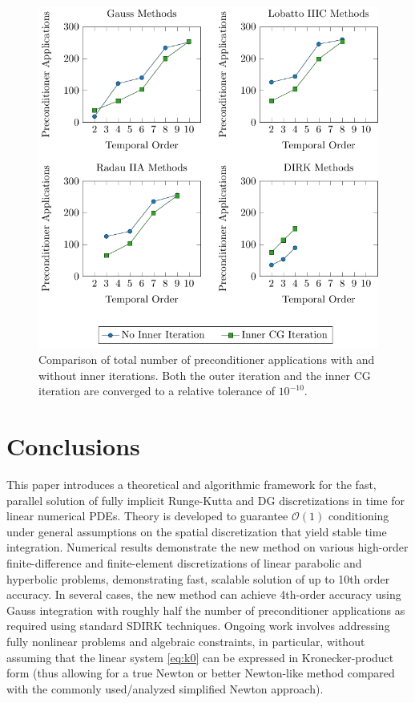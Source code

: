 \documentclass[review]{siamart}
\begin{document}
\begin{figure}[!ht]
	\centering
	\includegraphics{figures/high_order_diff_iters/high_order_diff_iters}
	\caption{
		Comparison of total number of preconditioner applications with and without
		inner iterations.
		Both the outer iteration and the inner CG iteration are converged to a
		relative tolerance of $10^{-10}$.
	}
	\label{fig:high-order-diff-iters}
\end{figure}

\section{Conclusions}\label{sec:conc}

This paper introduces a theoretical and algorithmic framework for the fast, parallel
solution of fully implicit Runge-Kutta and DG discretizations in time for linear
numerical PDEs. Theory is developed to guarantee $\mathcal{O}(1)$ conditioning under
general assumptions on the spatial discretization that yield stable time integration.
Numerical results demonstrate the new method on various high-order finite-difference
and finite-element discretizations of linear parabolic and hyperbolic problems,
demonstrating fast, scalable solution of up to 10th order accuracy. In several
cases, the new method can achieve 4th-order accuracy using Gauss integration
with roughly half the number of preconditioner applications as required using
standard SDIRK techniques. Ongoing work involves addressing fully nonlinear
problems and algebraic constraints, in particular, without assuming that the
linear system \eqref{eq:k0} can be expressed in Kronecker-product form (thus
allowing for a true Newton or better Newton-like method compared with the
commonly used/analyzed simplified Newton approach).



\end{document}
